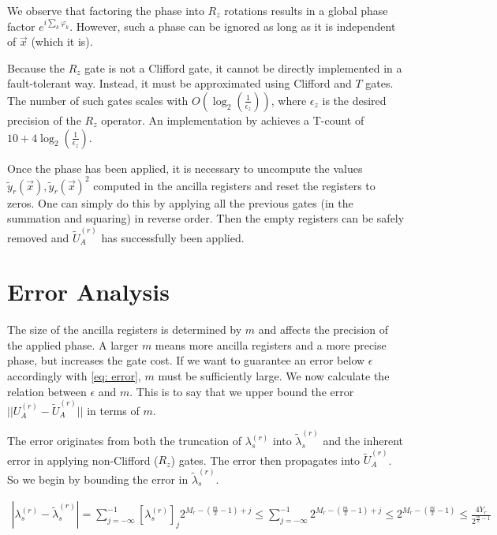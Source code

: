 We observe that factoring the phase into $R_z$ rotations results in a global phase factor $e^{i\sum_k \varphi_k}$. However, such a phase can be ignored as long as it is independent of $\vec{x}$ (which it is).

Because the $R_z$ gate is not a Clifford gate, it cannot be directly implemented in a fault-tolerant way. Instead, it must be approximated using Clifford and $T$ gates. The number of such gates scales with $O(\log_2(\frac{1}{\epsilon_z}))$, where $\epsilon_z$ is the desired precision of the $R_z$ operator. An implementation by \cite{Rz} achieves a T-count of $10 + 4\log_2(\frac{1}{\epsilon_z})$. 

Once the phase has been applied, it is necessary to uncompute the values $\tilde{y}_r(\vec{x}), \tilde{y}_r(\vec{x})^2$ computed in the ancilla registers and reset the registers to zeros. One can simply do this by applying all the previous gates (in the summation and squaring) in reverse order. Then the empty registers can be safely removed and $\tilde{U}_A^{(r)}$ has successfully been applied.

\section{Error Analysis}

The size of the ancilla registers is determined by $m$ and affects the precision of the applied phase. A larger $m$ means more ancilla registers and a more precise phase, but increases the gate cost. If we want to guarantee an error below $\epsilon$ accordingly with \eqref{eq: error}, $m$ must be sufficiently large. We now calculate the relation between $\epsilon$ and $m$. This is to say that we upper bound the error $||U_A^{(r)} - \tilde{U}_A^{(r)}||$ in terms of $m$.

The error originates from both the truncation of $\lambda^{(r)}_s$ into $\tilde{\lambda}^{(r)}_s$ and the inherent error in applying non-Clifford ($R_z$) gates. The error then propagates into $\tilde{U}_A^{(r)}$. So we begin by bounding the error in $\tilde{\lambda}^{(r)}_s$.

\begin{equation}
    \begin{split}
        |\lambda^{(r)}_s - \tilde{\lambda}^{(r)}_s| = \sum_{j = -\infty}^{-1} [\lambda^{(r)}_s]_j2^{M_r - (\frac{m}{2} - 1) + j} \leq \sum_{j = -\infty}^{-1} 2^{M_r - (\frac{m}{2} - 1) + j} \leq 2^{M_r - (\frac{m}{2} - 1)} \leq \frac{4Y_r}{2^{\frac{m}{2} - 1}}
    \end{split}
\end{equation}

